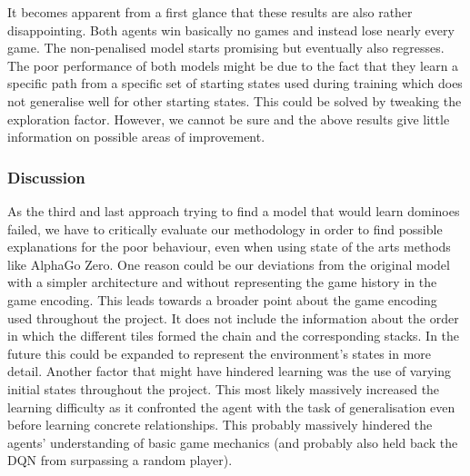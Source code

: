 \documentclass[12pt,a4paper]{article}
\begin{document}
It becomes apparent from a first glance that these results are also rather disappointing. Both agents win basically no games and instead lose nearly every game. The non-penalised model starts promising but eventually also regresses. The poor performance of both models might be due to the fact that they learn a specific path from a specific set of starting states used during training which does not generalise well for other starting states. This could be solved by tweaking the exploration factor. However, we cannot be sure and the above results give little information on possible areas of improvement.

\subsubsection{Discussion}
As the third and last approach trying to find a model that would learn dominoes failed, we have to critically evaluate our methodology in order to find possible explanations for the poor behaviour, even when using state of the arts methods like AlphaGo Zero. One reason could be our deviations from the original model with a simpler architecture and without representing the game history in the game encoding. This leads towards a broader point about the game encoding used throughout the project. It does not include the information about the order in which the different tiles formed the chain and the corresponding stacks. In the future this could be expanded to represent the environment’s states in more detail.
Another factor that might have hindered learning was the use of varying initial states throughout the project. This most likely massively increased the learning difficulty as it confronted the agent with the task of generalisation even before learning concrete relationships. This probably massively hindered the agents' understanding of basic game mechanics (and probably also held back the DQN from surpassing a random player). 
\end{document}
